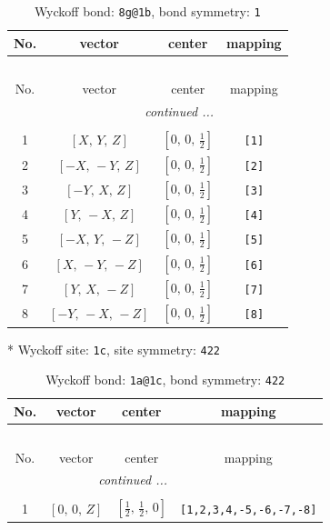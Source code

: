 \documentclass[fleqn,8pt]{jsarticle}
\begin{document}
\begin{longtable}{cccc}
\caption{Wyckoff bond: {\tt 8g@1b}, bond symmetry: {\tt 1}}
 \\
 \hline \hline
No. & vector & center & mapping \\ \hline \endfirsthead

\multicolumn{3}{l}{\tablename\ \thetable{}} \\
 \hline \hline
No. & vector & center & mapping \\ \hline \endhead

 \hline \hline
\multicolumn{3}{r}{\footnotesize\it continued ...} \\ \endfoot

 \hline \hline
\multicolumn{3}{r}{} \\ \endlastfoot

1 & $\left[ X,\, Y,\, Z \right]$ & $\left[ 0,\, 0,\, \frac{1}{2} \right]$ & {\tt [1]} \\ \hline
2 & $\left[ - X,\, - Y,\, Z \right]$ & $\left[ 0,\, 0,\, \frac{1}{2} \right]$ & {\tt [2]} \\ \hline
3 & $\left[ - Y,\, X,\, Z \right]$ & $\left[ 0,\, 0,\, \frac{1}{2} \right]$ & {\tt [3]} \\ \hline
4 & $\left[ Y,\, - X,\, Z \right]$ & $\left[ 0,\, 0,\, \frac{1}{2} \right]$ & {\tt [4]} \\ \hline
5 & $\left[ - X,\, Y,\, - Z \right]$ & $\left[ 0,\, 0,\, \frac{1}{2} \right]$ & {\tt [5]} \\ \hline
6 & $\left[ X,\, - Y,\, - Z \right]$ & $\left[ 0,\, 0,\, \frac{1}{2} \right]$ & {\tt [6]} \\ \hline
7 & $\left[ Y,\, X,\, - Z \right]$ & $\left[ 0,\, 0,\, \frac{1}{2} \right]$ & {\tt [7]} \\ \hline
8 & $\left[ - Y,\, - X,\, - Z \right]$ & $\left[ 0,\, 0,\, \frac{1}{2} \right]$ & {\tt [8]} \\
\end{longtable}
* Wyckoff site: {\tt 1c}, site symmetry: {\tt 422}
\renewcommand{\arraystretch}{1.2}
\begin{longtable}{cccc}
\caption{Wyckoff bond: {\tt 1a@1c}, bond symmetry: {\tt 422}}
 \\
 \hline \hline
No. & vector & center & mapping \\ \hline \endfirsthead

\multicolumn{3}{l}{\tablename\ \thetable{}} \\
 \hline \hline
No. & vector & center & mapping \\ \hline \endhead

 \hline \hline
\multicolumn{3}{r}{\footnotesize\it continued ...} \\ \endfoot

 \hline \hline
\multicolumn{3}{r}{} \\ \endlastfoot

1 & $\left[ 0,\, 0,\, Z \right]$ & $\left[ \frac{1}{2},\, \frac{1}{2},\, 0 \right]$ & {\tt [1,2,3,4,-5,-6,-7,-8]} \\
\end{longtable}
\end{document}

